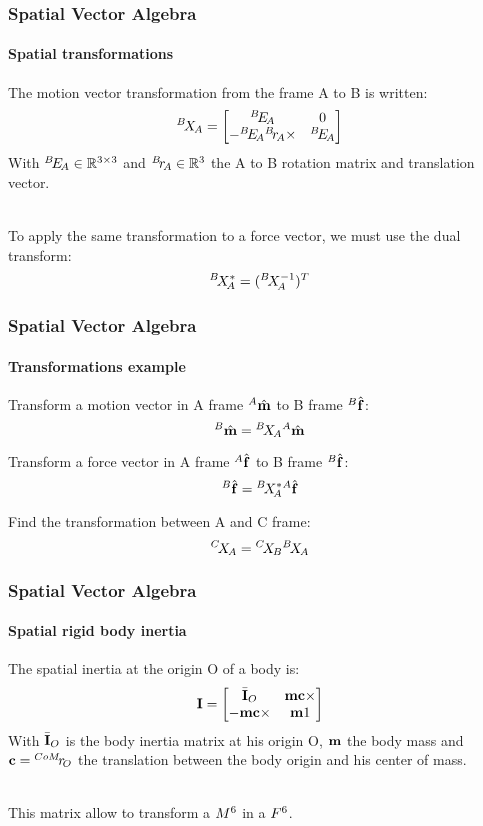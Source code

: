 \documentclass{beamer}
\begin{document}
  	\begin{frame}
		\frametitle{Spatial Vector Algebra}
		\framesubtitle{Spatial transformations}
		The motion vector transformation from the frame A to B is written:
		$$
		\transform{A}{B} = \begin{bmatrix} \rotation{A}{B} & 0 \\ -\rotation{A}{B} \translation{A}{B} \times & \rotation{A}{B} \end{bmatrix}
		$$
		With $ \rotation{A}{B} \in \mathbb{R}^{3{\times}3} $ and $ \translation{A}{B} \in \mathbb{R}^{3} $ the A to B rotation matrix and translation vector.

		\hfill \\
		To apply the same transformation to a force vector, we must use the dual transform:
		$$
		\transformDual{A}{B} = (\transformInv{A}{B})^T
		$$
	\end{frame}


  	\begin{frame}
		\frametitle{Spatial Vector Algebra}
		\framesubtitle{Transformations example}
		Transform a motion vector in A frame $ \motionvecHatFrame{A} $ to B frame $ \forcevecHatFrame{B} $:
		$$
		\motionvecHatFrame{B} = \transform{A}{B} \motionvecHatFrame{A}
		$$

		Transform a force vector in A frame $ \forcevecHatFrame{A} $ to B frame $ \forcevecHatFrame{B} $:
		$$
		\forcevecHatFrame{B} = \transformDual{A}{B} \forcevecHatFrame{A}
		$$

		Find the transformation between A and C frame:
		$$
		\transform{A}{C} = \transform{B}{C}\transform{A}{B}
		$$
	\end{frame}


  	\begin{frame}
		\frametitle{Spatial Vector Algebra}
		\framesubtitle{Spatial rigid body inertia}
		The spatial inertia at the origin O of a body is:
		$$
		\inertia = \begin{bmatrix} \inertiaBarOrigin{O} & \mass \bodycom \times \\ -\mass \bodycom \times & \mass1 \end{bmatrix}
		$$
		With $ \inertiaBarOrigin{O} $ is the body inertia matrix at his origin O, $ \mass $ the body mass and $ \bodycom = \translation{O}{{CoM}} $ the translation between the body origin and his center of mass.

		\hfill \\
		This matrix allow to transform a $ \motionspace{6} $ in a $ \forcespace{6} $.
	\end{frame}
\end{document}
